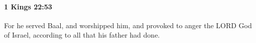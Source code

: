 		\paragraph{1 Kings 22:53} %
			\label{1KINGS-22-53}

			For he served Baal, and worshipped him, and provoked to anger the LORD God of Israel, according to all that his father had done.

